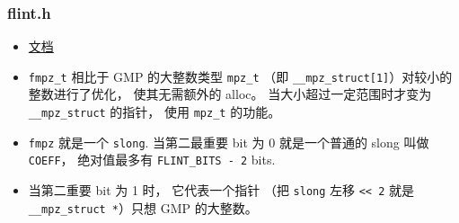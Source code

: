 
\begin{issues}
\issueDraft
\end{issues}


\subsubsection{flint.h}
\begin{itemize}
\item \href{http://flintlib.org/sphinx/fmpz.html}{文档}
\item \verb|fmpz_t| 相比于 GMP 的大整数类型 \verb|mpz_t| （即 \verb|__mpz_struct[1]|）对较小的整数进行了优化， 使其无需额外的 alloc。 当大小超过一定范围时才变为 \verb|__mpz_struct| 的指针， 使用 \verb|mpz_t| 的功能。
\item \verb|fmpz| 就是一个 \verb|slong|. 当第二最重要 bit 为 0 就是一个普通的 slong 叫做 \verb|COEFF|， 绝对值最多有 \verb|FLINT_BITS - 2| bits.
\item 当第二重要 bit 为 1 时， 它代表一个指针 （把 \verb|slong| 左移 \verb|<< 2| 就是 \verb|__mpz_struct *|）只想 GMP 的大整数。
\end{itemize}
